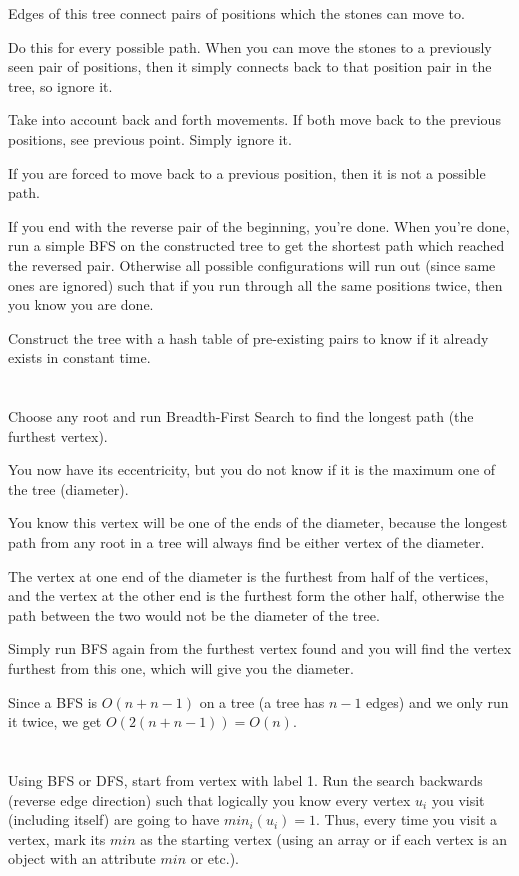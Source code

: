 \documentclass[11pt,letterpaper]{article}
\begin{document}
	Edges of this tree connect pairs of positions which the stones can move to.
	
	Do this for every possible path. When you can move the stones to a previously seen pair of positions, then it simply connects back to that position pair in the tree, so ignore it.
	
	Take into account back and forth movements. If both move back to the previous positions, see previous point. Simply ignore it.
	
	If you are forced to move back to a previous position, then it is not a possible path.
	
	If you end with the reverse pair of the beginning, you're done.
	When you're done, run a simple BFS on the constructed tree to get the shortest path which reached the reversed pair.
	Otherwise all possible configurations will run out (since same ones are ignored) such that if you run through all the same positions twice, then you know you are done.
	
	Construct the tree with a hash table of pre-existing pairs to know if it already exists in constant time.
	
	\section{}
	Choose any root and run Breadth-First Search to find the longest path (the furthest vertex).
	
	You now have its eccentricity, but you do not know if it is the maximum one of the tree (diameter).
	
	You know this vertex will be one of the ends of the diameter, because the longest path from any root in a tree will always find be either vertex of the diameter.
	
	The vertex at one end of the diameter is the furthest from half of the vertices, and the vertex at the other end is the furthest form the other half, otherwise the path between the two would not be the diameter of the tree.
	
	Simply run BFS again from the furthest vertex found and you will find the vertex furthest from this one, which will give you the diameter.
	
	Since a BFS is $O(n+n-1)$ on a tree (a tree has $n-1$ edges) and we only run it twice, we get $O(2(n+n-1))=O(n)$.
	
	\section{}
	Using BFS or DFS, start from vertex with label 1. Run the search backwards (reverse edge direction) such that logically you know every vertex $u_i$ you visit (including itself) are going to have $min_i(u_i)=1$. Thus, every time you visit a vertex, mark its $min$ as the starting vertex (using an array or if each vertex is an object with an attribute $min$ or etc.).
	
\end{document}
